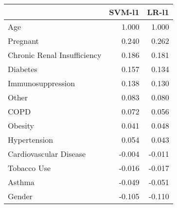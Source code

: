 \begin{tabular}{lrr}
\toprule
{} &  SVM-l1 &  LR-l1 \\
\midrule
Age                         &   1.000 &  1.000 \\
Pregnant                    &   0.240 &  0.262 \\
Chronic Renal Insufficiency &   0.186 &  0.181 \\
Diabetes                    &   0.157 &  0.134 \\
Immunosuppression           &   0.138 &  0.130 \\
Other                       &   0.083 &  0.080 \\
COPD                        &   0.072 &  0.056 \\
Obesity                     &   0.041 &  0.048 \\
Hypertension                &   0.054 &  0.043 \\
Cardiovascular Disease      &  -0.004 & -0.011 \\
Tobacco Use                 &  -0.016 & -0.017 \\
Asthma                      &  -0.049 & -0.051 \\
Gender                      &  -0.105 & -0.110 \\
\bottomrule
\end{tabular}
